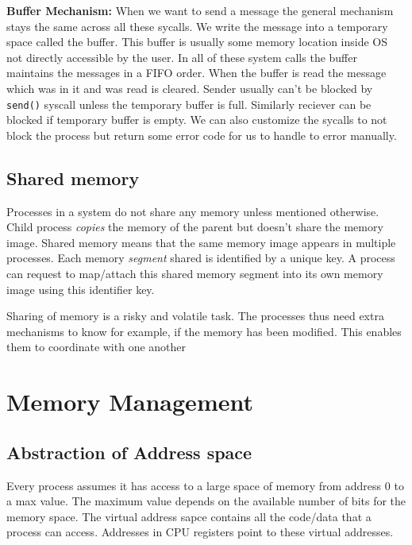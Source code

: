 \documentclass[12pt]{article}
\newcommand{\tbox}[1]{\noindent\fbox{\parbox{\textwidth}{#1}}}
\begin{document}
\textbf{Buffer Mechanism:}  
When we want to send a message the general mechanism stays the same across all these sycalls. We write the message into a temporary space called the buffer. This buffer is usually some memory location
inside OS not directly accessible by the user.
In all of these system calls the buffer maintains the messages in a FIFO order. When the buffer is read the message which was in it and was read is cleared. Sender 
usually can't be blocked by \texttt{send()} syscall unless the temporary buffer is full. Similarly reciever can be blocked if temporary buffer is empty. We can also customize the sycalls to not block the process
but return some error code for us to handle to error manually.

\subsection{Shared memory}
Processes in a system do not share any memory unless mentioned otherwise. Child process \textit{copies} the memory of the parent but doesn't share the memory image.
Shared memory means that the same memory image appears in multiple processes. Each memory \textit{segment} shared is identified by a unique key. A process can request to map/attach this shared 
memory segment into its own memory image using this identifier key. 

Sharing of memory is a risky and volatile task. The processes thus need extra mechanisms to know for example, if the memory has been modified. This enables them to coordinate with one another


\noindent\tbox{
    \begin{center}
    \textbf{\Huge Lecture 12}
    \end{center}
}
\section{Memory Management}
\subsection*{Abstraction of Address space}
Every process assumes it has access to a large space of memory from address 0 to a max value. The maximum value depends on the available number of bits for the memory space.
The virtual address sapce contains all the code/data that a process can access. Addresses in CPU registers point to these virtual addresses.
\end{document}
